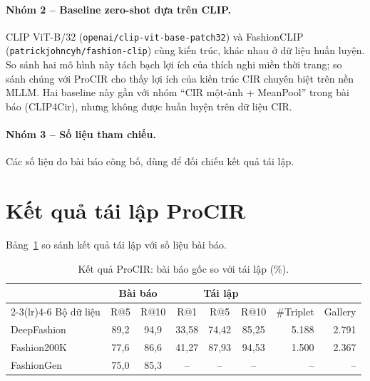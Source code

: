 \paragraph{Nhóm 2 -- Baseline zero-shot dựa trên CLIP.} CLIP ViT-B/32 (\texttt{openai/clip-vit-base-patch32}) và FashionCLIP (\texttt{patrickjohncyh/fashion-clip}) cùng kiến trúc, khác nhau ở dữ liệu huấn luyện. So sánh hai mô hình này tách bạch lợi ích của thích nghi miền thời trang; so sánh chúng với ProCIR cho thấy lợi ích của kiến trúc CIR chuyên biệt trên nền MLLM. Hai baseline này gần với nhóm ``CIR một-ảnh + MeanPool'' trong bài báo (CLIP4Cir), nhưng không được huấn luyện trên dữ liệu CIR.

\paragraph{Nhóm 3 -- Số liệu tham chiếu.} Các số liệu do bài báo công bố, dùng để đối chiếu kết quả tái lập.

\section{Kết quả tái lập ProCIR}\label{sec:repro-results}

Bảng~\ref{tab:repro} so sánh kết quả tái lập với số liệu bài báo.

\begin{table}[h]
\centering
\caption{Kết quả ProCIR: bài báo gốc so với tái lập (\%).}
\label{tab:repro}
\begin{tabular}{lcccccrr}
\toprule
& \multicolumn{2}{c}{Bài báo} & \multicolumn{3}{c}{Tái lập} & & \\
\cmidrule(lr){2-3}\cmidrule(lr){4-6}
Bộ dữ liệu & R@5 & R@10 & R@1 & R@5 & R@10 & \#Triplet & Gallery \\
\midrule
DeepFashion & 89,2 & 94,9 & 33,58 & 74,42 & 85,25 & 5.188 & 2.791 \\
Fashion200K & 77,6 & 86,6 & 41,27 & 87,93 & 94,53 & 1.500 & 2.367 \\
FashionGen  & 75,0 & 85,3 & -- & -- & -- & -- & -- \\
\bottomrule
\end{tabular}
\end{table}

